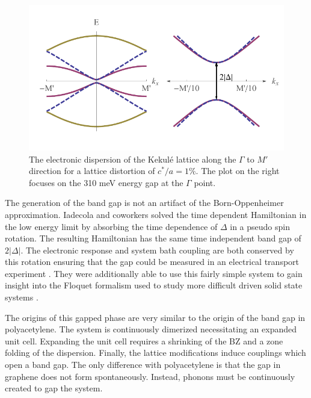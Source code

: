 \begin{figure}
	\begin{center}
	\includegraphics{Figs_Kekule/gapped.pdf}
	\end{center}
	\caption[Gapped electronic dispersion of the Kekul\'e lattice]{\label{fig:kek:gapped}
		The electronic dispersion of the Kekul\'e lattice along the $\Gamma$ to $M'$ direction for a lattice distortion of $c^*/a=1\%$.
		The plot on the right focuses on the 310 meV energy gap at the $\Gamma$ point.
	}
\end{figure}

The generation of the band gap is not an artifact of the Born-Oppenheimer approximation.
Iadecola and coworkers solved the time dependent Hamiltonian in the low energy limit by absorbing the time dependence of $\Delta$ in a pseudo spin rotation.
The resulting Hamiltonian has the same time independent band gap of $2 |\Delta|$.
The electronic response and system bath coupling are both conserved by this rotation ensuring that the gap could be measured in an electrical transport experiment \cite{Iadecola2013}.
They were additionally able to use this fairly simple system to gain insight into the Floquet formalism used to study more difficult driven solid state systems \cite{Iadecola2013a}.

The origins of this gapped phase are very similar to the origin of the band gap in polyacetylene.
The system is continuously dimerized necessitating an expanded unit cell.
Expanding the unit cell requires a shrinking of the BZ and a zone folding of the dispersion.
Finally, the lattice modifications induce couplings which open a band gap.
The only difference with polyacetylene is that the gap in graphene does not form spontaneously.
Instead, phonons must be continuously created to gap the system.

